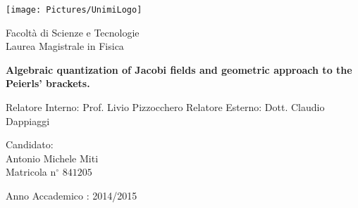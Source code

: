 \documentclass[
    pdftex,
    fontsize=11pt,
    a4paper
   ]{scrbook}
\begin{document}
\begin{titlepage}
{
\thispagestyle{empty}

\centerline{
\texttt{[image: Pictures/UnimiLogo]}
}

\begin{center}
{\Large Facoltà di Scienze e Tecnologie\\
\vskip0.2cm Laurea Magistrale in Fisica }
\end{center}


\vskip1.5cm
\begin{center}
{\huge \textbf{Algebraic quantization of Jacobi fields and geometric approach to the Peierls' brackets.}}
\end{center}

{\large
\vskip20mm Relatore Interno:  Prof. Livio Pizzocchero 
\vskip1mm Relatore Esterno:  Dott. Claudio Dappiaggi
}

\vskip2cm
\hskip9cm\parbox[t]{7cm}
{\large 
	Candidato:\\
	\quad Antonio Michele Miti\\
	\quad Matricola n$^\circ$ $841205$\\
}
	\vfill
	\begin{center}
		Anno Accademico : 2014/2015
	\end{center}

\newpage
\newpage
\thispagestyle{empty}
\clearpage
}

\end{titlepage}
\end{document}
